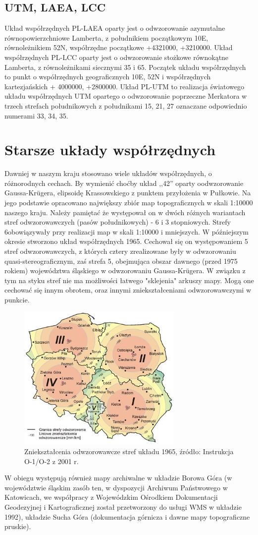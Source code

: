 \documentclass[a4paper,11pt, onecolumn, openany]{memoir}
\begin{document}
			\subsection{UTM, LAEA, LCC}
			Układ współrzędnych PL-LAEA oparty jest o odwzorowanie azymutalne równopowierzchniowe Lamberta, z południkiem początkowym 10E, równoleżnikiem 52N, współrzędne początkowe +4321000, +3210000.
			Układ współrzędnych PL-LCC oparty jest o odwzorowanie stożkowe równokątne Lamberta, z równoleżnikami siecznymi 35 i 65. Początek układu współrzędnych to punkt o współrzędnych geograficznych 10E, 52N i współrzędnych kartezjańskich + 4000000, +2800000.
			Układ PL-UTM to realizacja światowego układu współrzędnych UTM opartego o odwzorowanie poprzeczne Merkatora w trzech strefach południkowych z południkami 15, 21, 27 oznaczane odpowiednio numerami 33, 34, 35.
		\section{Starsze układy współrzędnych}
			Dawniej w naszym kraju stosowano wiele układów współrzędnych, o różnorodnych cechach. By wymienić choćby układ ,,42'' oparty oodwzorowanie Gaussa-Kr\"ugera, elipsoidę Krassowskiego z punktem przyłożenia w Pułkowie. Na jego podstawie opracowano największy zbiór map topograficznych w skali 1:10000 naszego kraju. Należy pamiętać że występował on w dwóch różnych wariantach stref odwzorowawczych (pasów południkowych) - 6 i 3 stopniowych. Strefy 6\degree obowiązywały przy realizacji map w skali 1:10000 i mniejszych.
			W późniejszym okresie stworzono układ współrzędnych 1965. Cechował się on występowaniem 5 stref odwzorowawczych, z których cztery zrealizowane były w odwzorowaniu quasi-stereograficznym, zaś strefa 5, obejmująca obszar dawnego (przed 1975 rokiem) województwa śląskiego w odwzorowaniu Gaussa-Kr\"ugera. W związku z tym na styku stref nie ma możliwości łatwego "sklejenia" arkuszy mapy. Mogą one cechować się innym obrotem, oraz innymi zniekształceniami odwzorowawczymi w punkcie. 
			\begin{figure}[!ht]
				\centering
				\includegraphics[width=8cm]{crs-1965-znieksztalcenia}
				\caption{Zniekształcenia odwzorowawcze stref układu 1965, źródło: Instrukcja O-1/O-2 z 2001 r.}
			\end{figure}
			W obiegu występują również mapy archiwalne w układzie Borowa Góra (w województwie śląskim zasób ten, w dyspozycji Archiwum Państwowego w Katowicach, we współpracy z Wojewódzkim Ośrodkiem Dokumentacji Geodezyjnej i Kartograficznej został przetworzony do usługi WMS w układzie 1992), układzie Sucha Góra (dokumentacja górnicza i dawne mapy topograficzne pruskie).
\end{document}
